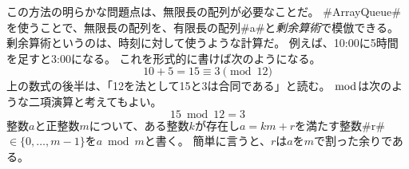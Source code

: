 この方法の明らかな問題点は、無限長の配列が必要なことだ。
#ArrayQueue#を使うことで、無限長の配列を、有限長の配列#a#と\emph{剰余算術}で模倣できる。
%
剰余算術というのは、時刻に対して使うような計算だ。
例えば、10:00に5時間を足すと3:00になる。
これを形式的に書けば次のようになる。
\[
    10 + 5 = 15 \equiv 3 \pmod{12}
\]
上の数式の後半は、「12を法として15と3は合同である」と読む。
$\bmod$は次のような二項演算と考えてもよい。
\[
   15 \bmod 12 = 3
\]
整数$a$と正整数$m$について、ある整数$k$が存在し$a = km + r$を満たす整数#r# $\in \{0, \ldots, m-1 \}$を$a \bmod m $と書く。
簡単に言うと、$r$は$a$を$m$で割った余りである。
